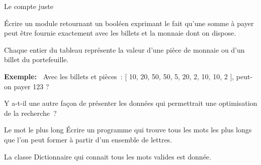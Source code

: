 	\begin{Exercice}{Le compte juste}
		
		Écrire un module retournant un booléen exprimant 
		le fait qu'une somme à payer peut être fournie 
		exactement avec les billets et la monnaie dont on dispose.
		
		
		Chaque entier du tableau représente la valeur d'une 
		pièce de monnaie ou d'un billet du portefeuille.

		\textbf{Exemple:~} 
		Avec les billets et pièces~: [ 10, 20, 50, 50, 5, 20, 2, 10, 10, 2 ], 
		peut-on payer 123 {\texteuro} ?
		
		Y a-t-il une autre façon de présenter les données 
		qui permettrait une optimisation de la recherche~?
	\end{Exercice}
	
	\begin{Exercice}{Le mot le plus long}
		Écrire un programme qui trouve tous les mots les plus 
		longs que l'on peut former à partir d'un ensemble de lettres.
		

		La classe Dictionnaire qui connait tous les mots valides est donnée.
		
		
	\end{Exercice}
		